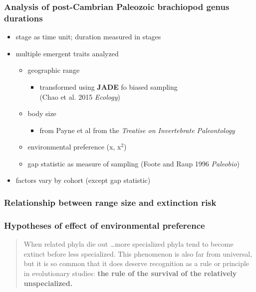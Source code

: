 \documentclass{beamer}
\begin{document}
\begin{frame}
  \frametitle{Analysis of post-Cambrian Paleozoic brachiopod genus durations}
  \begin{itemize}
    \item stage as time unit; duration measured in stages
    \item multiple emergent traits analyzed
      \begin{itemize}
        \item geographic range
          \begin{itemize}
            \item transformed using \textbf{JADE} fo biased sampling \\(Chao et al. 2015 \textit{Ecology})
          \end{itemize}
        \item body size
          \begin{itemize}
            \item from Payne et al from the \textit{Treatise on Invertebrate Paleontology}
          \end{itemize}
        \item environmental preference (x, x\(^2\))
        \item gap statistic as measure of sampling (Foote and Raup 1996 \textit{Paleobio})
      \end{itemize}
    \item factors vary by cohort (except gap statistic)
  \end{itemize}
\end{frame}


\begin{frame}
  \frametitle{Relationship between range size and extinction risk}
\end{frame}


\begin{frame}
  \frametitle{Hypotheses of effect of environmental preference}
  \begin{quote}
    When related phyla die out \dots more specialized phyla tend to become extinct before less specialized. This phenomenon is also far from universal, but it is so common that it does deserve recognition as a rule or principle in evolutionary studies: \textbf{the rule of the survival of the relatively unspecialized.}

  \end{quote}
\end{frame}
\end{document}

